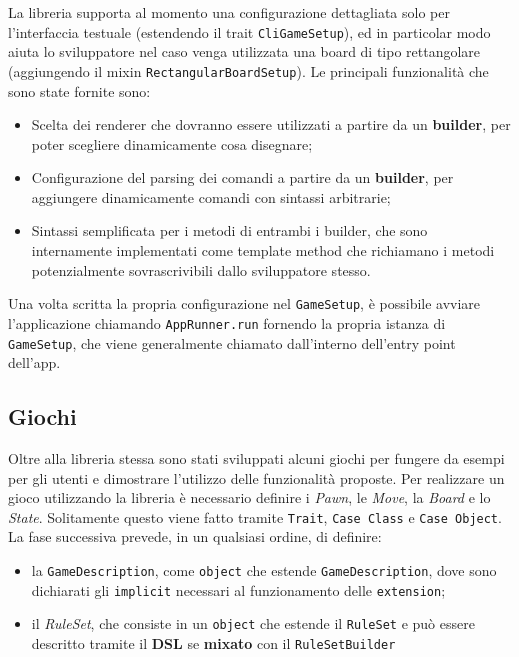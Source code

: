 La libreria supporta al momento una configurazione dettagliata solo per l'interfaccia testuale (estendendo il trait \texttt{CliGameSetup}), ed in particolar modo aiuta lo sviluppatore nel caso venga utilizzata una board di tipo rettangolare (aggiungendo il mixin \texttt{RectangularBoardSetup}).
%
Le principali funzionalità che sono state fornite sono:
%
\begin{itemize}
  \item Scelta dei renderer che dovranno essere utilizzati a partire da un \textbf{builder}, per poter scegliere dinamicamente cosa disegnare;
  \item Configurazione del parsing dei comandi a partire da un \textbf{builder}, per aggiungere dinamicamente comandi con sintassi arbitrarie;
  \item Sintassi semplificata per i metodi di entrambi i builder, che sono internamente implementati come template method che richiamano i metodi potenzialmente sovrascrivibili dallo sviluppatore stesso.
\end{itemize}

Una volta scritta la propria configurazione nel \texttt{GameSetup}, è possibile avviare l'applicazione chiamando \texttt{AppRunner.run} fornendo la propria istanza di \texttt{GameSetup}, che viene generalmente chiamato dall'interno dell'entry point dell'app.


\subsection{Giochi}
Oltre alla libreria stessa sono stati sviluppati alcuni giochi per fungere da esempi per gli utenti e dimostrare l'utilizzo delle funzionalità proposte.
%
Per realizzare un gioco utilizzando la libreria è necessario definire i \textit{Pawn}, le \textit{Move}, la \textit{Board} e lo \textit{State}.%
%
Solitamente questo viene fatto tramite \texttt{Trait}, \texttt{Case Class} e \texttt{Case Object}.
%
La fase successiva prevede, in un qualsiasi ordine, di definire:
\begin{itemize}
  \item la \texttt{GameDescription}, come \texttt{object} che estende \texttt{GameDescription}, dove sono dichiarati gli \texttt{implicit} necessari al funzionamento delle \texttt{extension};
  \item il \textit{RuleSet}, che consiste in un \texttt{object} che estende il \texttt{RuleSet} e può essere descritto tramite il \textbf{DSL} se \textbf{mixato} con il \texttt{RuleSetBuilder}
\end{itemize}

